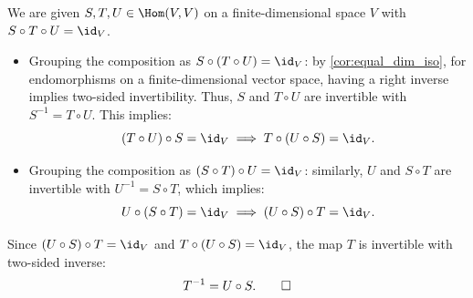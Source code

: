 \begin{exercisesolution}
\label{sol:invertibility_three_map_composition}
We are given $S, T, U \in \Hom(V, V)$ on a finite-di\-men\-sional space $V$ with $S \circ T \circ U = \id_V$.

\begin{itemize}
    \item Grouping the composition as $S \circ (T \circ U) = \id_V$: by \cref{cor:equal_dim_iso}, for endomorphisms on a finite-di\-men\-sional vector space, having a right inverse implies two-sided invertibility. Thus, $S$ and $T \circ U$ are invertible with $S^{-1} = T \circ U$. This implies:
    \[
    (T \circ U) \circ S = \id_V \implies T \circ (U \circ S) = \id_V.
    \]
    \item Grouping the composition as $(S \circ T) \circ U = \id_V$: similarly, $U$ and $S \circ T$ are invertible with $U^{-1} = S \circ T$, which implies:
    \[
    U \circ (S \circ T) = \id_V \implies (U \circ S) \circ T = \id_V.
    \]
\end{itemize}
Since $(U \circ S) \circ T = \id_V$ and $T \circ (U \circ S) = \id_V$, the map $T$ is invertible with two-sided inverse:
\[
T^{-1} = U \circ S. \qedhere
\]
\end{exercisesolution}

